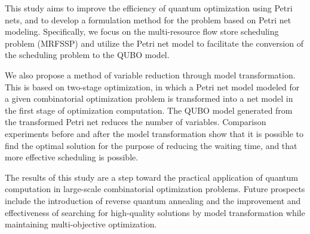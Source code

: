 \documentclass[a4j,12pt]{jreport}
\begin{document}
This study aims to improve the efficiency of quantum optimization using Petri nets, and to develop a formulation method for the problem based on Petri net modeling. Specifically, we focus on the multi-resource flow store scheduling problem (MRFSSP) and utilize the Petri net model to facilitate the conversion of the scheduling problem to the QUBO model.

We also propose a method of variable reduction through model transformation. This is based on two-stage optimization, in which a Petri net model modeled for a given combinatorial optimization problem is transformed into a net model in the first stage of optimization computation. The QUBO model generated from the transformed Petri net reduces the number of variables. Comparison experiments before and after the model transformation show that it is possible to find the optimal solution for the purpose of reducing the waiting time, and that more effective scheduling is possible.

The results of this study are a step toward the practical application of quantum computation in large-scale combinatorial optimization problems. Future prospects include the introduction of reverse quantum annealing and the improvement and effectiveness of searching for high-quality solutions by model transformation while maintaining multi-objective optimization.

\tableofcontents        %
\listoffigures		%
\listoftables		%










%





%
\end{document}
